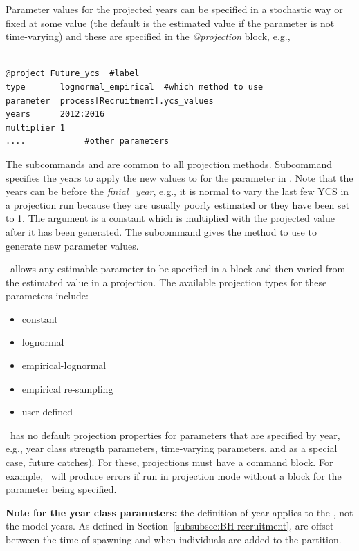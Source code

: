 Parameter values for the projected years can be specified in a stochastic way or fixed at some value (the default is the estimated value if the parameter is not time-varying) and these are specified in the \textit{@projection} block, e.g.,


{\small{\begin{verbatim}

@project Future_ycs  #label
type       lognormal_empirical  #which method to use
parameter  process[Recruitment].ycs_values
years      2012:2016
multiplier 1
....            #other parameters
\end{verbatim}}}


The subcommands  and  are common to all projection methods. Subcommand  specifies the years to apply the new values to for the parameter in . Note that the years can be before the \textit{finial\_year}, e.g., it is normal to vary the last few YCS in a projection run because they are usually poorly estimated or they have been set to 1.  The argument  is a constant which is multiplied with the projected value after it has been generated. The  subcommand gives the method to use to generate new parameter values.

\CNAME~allows any estimable parameter to be specified in a  block and then varied from the estimated value in a projection. The available projection types for these parameters include:

\begin{itemize}
	\item constant
	\item lognormal
	\item empirical-lognormal
	\item empirical re-sampling
	\item user-defined
\end{itemize}


\CNAME~has no default projection properties for parameters that are specified by year, e.g., year class strength parameters, time-varying parameters, and as a special case, future catches). For these, projections  must have a  command block. For example, \CNAME~will produce errors if run in projection mode without a  block for the  parameter being specified.

\textbf{Note for the year class parameters:} the definition of year applies to the , not the model years. As defined in Section~\ref{subsubsec:BH-recruitment},  are offset between the time of spawning and when individuals are added to the partition.

